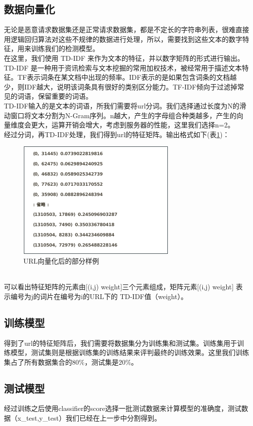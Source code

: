 \subsection{数据向量化}
无论是恶意请求数据集还是正常请求数据集，都是不定长的字符串列表，很难直接用逻辑回归算法对这些不规律的数据进行处理，所以，需要找到这些文本的数字特征，用来训练我们的检测模型。
\\\indent{}在这里，我们使用 TD-IDF 来作为文本的特征，并以数字矩阵的形式进行输出。TD-IDF 是一种用于资讯检索与文本挖掘的常用加权技术，被经常用于描述文本特征。TF表示词条在某文档中出现的频率。IDF表示的是如果包含词条的文档越少，则IDF越大，说明该词条具有很好的类别区分能力。TF-IDF倾向于过滤掉常见的词语，保留重要的词语。
\\\indent{}TD-IDF输入的是文本的词语，所我们需要将url分词。我们选择通过长度为N的滑动窗口将文本分割为N-Gram序列。n越大，产生的字母组合种类越多，产生的向量维度会更大，运算开销会增大，考虑到服务器的性能，这里我们选择n=2。
\\\indent{}经过分词，再TD-IDF处理，我们得到url的特征矩阵。输出格式如下(表\ref{fig:vec})：
\begin{figure}[!h]
    \setlength{\abovecaptionskip}{0.cm}
    \setlength{\belowcaptionskip}{-0.cm}
    \centering
     \includegraphics[scale=0.55]{Figs/vec.png}
    \caption{URL向量化后的部分样例}
    \label{fig:vec}
\end{figure}
\\\indent{}可以看出特征矩阵的元素由[(i,j) weight]三个元素组成，矩阵元素[(i,j) weight] 表示编号为j的词片在编号为i的URL下的 TD-IDF值（weight）。
\subsection{训练模型}
得到了url的特征矩阵后，我们需要将数据集分为训练集和测试集。训练集用于训练模型，测试集则是根据训练集的训练结果来评判最终的训练效果。这里我们训练集占了所有数据集合的$80\%$，测试集是$20\%$。
\subsection{测试模型}
经过训练之后使用classifier的score选择一批测试数据来计算模型的准确度，测试数据（x\_test,y\_test）我们已经在上一步中分割得到。
